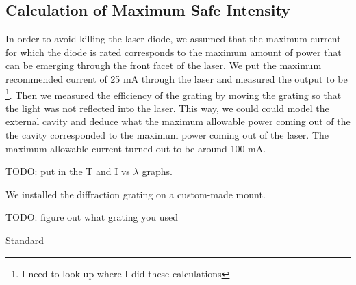 
\subsection{Calculation of Maximum Safe Intensity}
In order to avoid killing the laser diode, we assumed that the maximum current for which the diode is rated corresponds to the maximum amount of power that can be emerging through the front facet of the laser. We put the maximum recommended current of 25 mA through the laser and measured the output to be \footnote{I need to look up where I did these calculations}. Then we measured the efficiency of the grating by moving the grating so that the light was not reflected into the laser. This way, we could could model the external cavity and deduce what the maximum allowable power coming out of the the cavity corresponded to the maximum power coming out of the laser. The maximum allowable current turned out to be around 100 mA. 

 
TODO: put in the T and I vs $\lambda$ graphs. 

We installed the diffraction grating on a custom-made mount. 

TODO: figure out what grating you used 

Standard 


